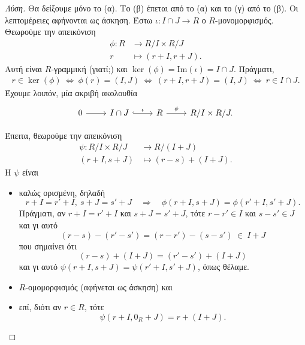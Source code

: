 \documentclass[12pt,a4paper,reqno]{amsart}
\theoremstyle{definition}
\renewcommand{\to}{\rightarrow}
\newcommand{\then}{\Rightarrow}
\newcommand{\rmIm}{\mathrm{Im}}
\begin{document}
\begin{proof}[Λύση]
    Θα δείξουμε μόνο το (α). Το (β) έπεται από το (α) και το (γ) από το (β). Οι λεπτομέρειες αφήνονται ως άσκηση. Έστω $\iota : I \cap J \to R$ ο  $R$-μονομορφισμός. Θεωρούμε την απεικόνιση 
    \begin{align*}
      \phi : R &\to R/I \times R/J \\
            r &\mapsto (r + I, r + J).
    \end{align*}
    Αυτή είναι $R$-γραμμική (γιατί;) και $\ker(\phi) = \rmIm(\iota)=I\cap{J}$. Πράγματι,
    \begin{align*}
      r \in \ker(\phi) 
      \ \Leftrightarrow \ \phi(r) = (I, J) 
      \ \Leftrightarrow \ (r+I, r+J) = (I, J) 
      \ \Leftrightarrow \ r \in I\cap J. 
    \end{align*}
    Έχουμε λοιπόν, μία ακριβή ακολουθία 
    \[
    \begin{tikzcd}
        0 \arrow[r] & I \cap J \arrow[r, hook, "\iota"] & R \arrow[r, "\phi"] & R/I \times R/J.
    \end{tikzcd}
    \]

    Έπειτα, θεωρούμε την απεικόνιση 
    \begin{align*}
      \psi: R/I \times R/J &\to R/(I+J) \\
      (r+I, s+J) &\mapsto (r-s) + (I+J).
    \end{align*}
    Η $\psi$ είναι 
    \begin{itemize}
      \item καλώς ορισμένη, δηλαδή 
      \[
      r + I = r' + I, \ s + J = s' + J \quad \then \quad 
      \phi(r+I,s+J) = \phi(r'+I,s'+J).
      \]
      Πράγματι, αν $r + I = r' + I$ και $s + J = s' + J$, τότε $r-r' \in I$ και $s-s' \in J$ και γι αυτό 
      \[
      (r-s) - (r'-s') = (r-r') - (s-s') \ \in \ I+J
      \]
      που σημαίνει ότι 
      \[
      (r-s) + (I+J) = (r'-s') + (I+J) 
      \]
      και γι αυτό $\psi(r+I, s+J) = \psi(r'+I, s'+J)$, όπως θέλαμε.
      \item $R$-ομομορφισμός (αφήνεται ως άσκηση) και 
      \item επί, διότι αν $r \in R$, τότε 
      \[
      \psi(r+I, 0_R + J) = r + (I+J).
      \]
    \end{itemize}


\end{proof}
\end{document}
